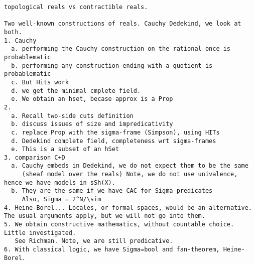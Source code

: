 \begin{verbatim}
topological reals vs contractible reals.

Two well-known constructions of reals. Cauchy Dedekind, we look at both.
1. Cauchy 
  a. performing the Cauchy construction on the rational once is probablematic
  b. performing any construction ending with a quotient is probablematic
  c. But Hits work
  d. we get the minimal cmplete field.
  e. We obtain an hset, becase approx is a Prop
2.
  a. Recall two-side cuts definition
  b. discuss issues of size and impredicativity
  c. replace Prop with the sigma-frame (Simpson), using HITs
  d. Dedekind complete field, completeness wrt sigma-frames
  e. This is a subset of an hSet
3. comparison C+D
  a. Cauchy embeds in Dedekind, we do not expect them to be the same 
     (sheaf model over the reals) Note, we do not use univalence, hence we have models in sSh(X).
  b. They are the same if we have CAC for Sigma-predicates
     Also, Sigma = 2^N/\sim
4. Heine-Borel... Locales, or formal spaces, would be an alternative. The usual arguments apply, but we will not go into them.
5. We obtain constructive mathematics, without countable choice. Little investigated.
   See Richman. Note, we are still predicative.
6. With classical logic, we have Sigma=bool and fan-theorem, Heine-Borel.
\end{verbatim}

